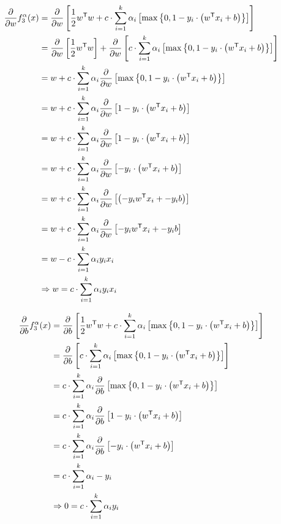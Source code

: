 \documentclass[15pt,landscape]{article}
\newcommand{\tr}{^\mathsf{T}}
\begin{document}
\begin{align}
\frac{\partial}{\partial w} f^{\alpha}_3(x) &= \frac{\partial}{\partial w} \left[  \frac{1}{2} w\tr w +c \cdot \sum\limits_{i=1}^k \alpha_i \left[ \oneLossReg \right] \right]\nonumber\\
&= \frac{\partial}{\partial w} \left[  \frac{1}{2} w\tr w \right] + \frac{\partial}{\partial w} \left[  c \cdot \sum\limits_{i=1}^k \alpha_i \left[\oneLossReg \right] \right]\nonumber\\
&= w +   c \cdot \sum\limits_{i=1}^k \alpha_i \frac{\partial}{\partial w} \left[\oneLossReg \right]\nonumber\\
&= w +   c \cdot \sum\limits_{i=1}^k \alpha_i \frac{\partial}{\partial w} \left[1-y_i \cdot \left( w\tr x_i + b \right) \right]\nonumber\\
&= w +   c \cdot \sum\limits_{i=1}^k \alpha_i \frac{\partial}{\partial w} \left[1-y_i \cdot \left( w\tr x_i + b \right) \right]\nonumber\\
&= w +   c \cdot \sum\limits_{i=1}^k \alpha_i \frac{\partial}{\partial w} \left[-y_i \cdot \left( w\tr x_i + b \right) \right]\nonumber\\
&= w +   c \cdot \sum\limits_{i=1}^k \alpha_i \frac{\partial}{\partial w} \left[\left( -y_i w\tr x_i + -y_i b \right) \right]\nonumber\\
&= w +   c \cdot \sum\limits_{i=1}^k \alpha_i \frac{\partial}{\partial w} \left[ -y_i w\tr x_i + -y_i b \right]\nonumber\\
&= w -   c \cdot \sum\limits_{i=1}^k \alpha_i  y_i x_i \nonumber\\
&\Rightarrow w =  c \cdot \sum\limits_{i=1}^k \alpha_i y_i x_i\label{df1w}
\end{align}

\begin{align*}
\frac{\partial}{\partial b} f^{\alpha}_3(x) &= \frac{\partial}{\partial b} \left[  \frac{1}{2} w\tr w +c \cdot \sum\limits_{i=1}^k \alpha_i \left[ \oneLossReg \right] \right]\\
&= \frac{\partial}{\partial b} \left[  c \cdot \sum\limits_{i=1}^k \alpha_i \left[ \oneLossReg \right] \right]\\
&=   c \cdot \sum\limits_{i=1}^k \alpha_i \frac{\partial}{\partial b} \left[  \oneLossReg \right]\\
&=   c \cdot \sum\limits_{i=1}^k \alpha_i \frac{\partial}{\partial b} \left[  1-y_i \cdot \left( w\tr x_i + b \right) \right]\\
&=   c \cdot \sum\limits_{i=1}^k \alpha_i \frac{\partial}{\partial b} \left[ -y_i \cdot \left( w\tr x_i + b \right) \right]\\
&=   c \cdot \sum\limits_{i=1}^k \alpha_i -y_i\\
&\Rightarrow 0 =    c \cdot \sum\limits_{i=1}^k \alpha_i y_i\\
\end{align*}
\end{document}
